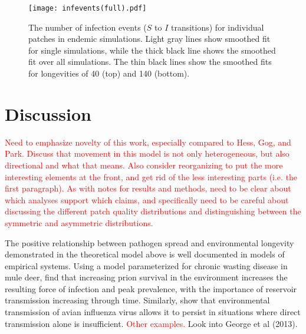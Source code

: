 \documentclass{svjour3}
\begin{document}
\begin{figure}
\centering
\texttt{[image: infevents(full).pdf]}
\caption{The number of infection events ($S$ to $I$ transitions) for individual patches in endemic simulations.  Light gray lines show smoothed fit for single simulations, while the thick black line shows the smoothed fit over all simulations.  The thin black lines show the smoothed fits for longevities of 40 (top) and 140 (bottom).}
\label{infections}
\end{figure}


\section{Discussion}
\label{discussion} 

\textcolor{red}{Need to emphasize novelty of this work, especially compared to Hess, Gog, and Park.  Discuss that movement in this model is not only heterogeneous, but also directional and what that means.  Also consider reorganizing to put the more interesting elements at the front, and get rid of the less interesting parts (i.e. the first paragraph).  As with notes for results and methods, need to be clear about which analyses support which claims, and specifically need to be careful about discussing the different patch quality distributions and distinguishing between the symmetric and asymmetric distributions.}

The positive relationship between pathogen spread and environmental longevity demonstrated in the theoretical model above is well documented in models of empirical systems.  Using a model parameterized for chronic wasting disease in mule deer, \cite{Almberg2011} find that increasing prion survival in the environment increases the resulting force of infection and peak prevalence, with the importance of reservoir transmission increasing through time.  Similarly, \cite{Breban2009} show that environmental transmission of avian influenza virus allows it to persist in situations where direct transmission alone is insufficient.  \textcolor{red}{Other examples.}  Look into George et al (2013).
\end{document}
